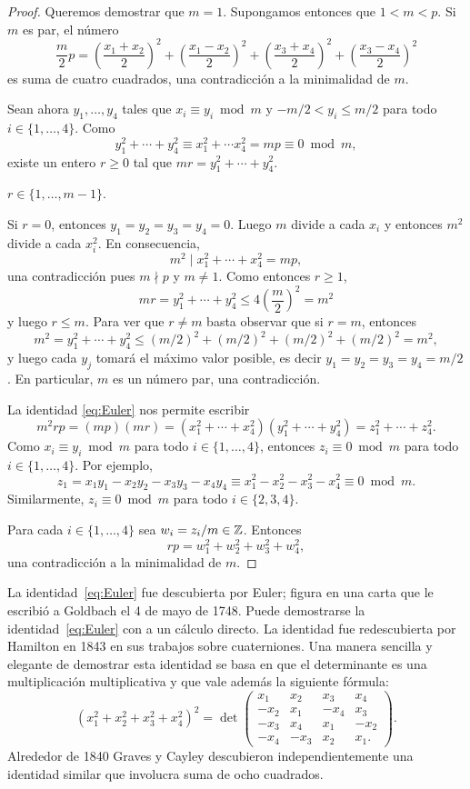 \begin{proof}
	Queremos demostrar que $m=1$. Supongamos
	entonces que $1<m<p$. Si $m$ es par, el número 
	\[
		\frac{m}{2}p=\left(\frac{x_1+x_2}{2}\right)^2
		+\left(\frac{x_1-x_2}{2}\right)^2
		+\left(\frac{x_3+x_4}{2}\right)^2
		+\left(\frac{x_3-x_4}{2}\right)^2
	\]
	es suma de cuatro cuadrados, una contradicción a la minimalidad de $m$. 
	
	Sean ahora $y_1,\dots,y_4$ tales que $x_i\equiv y_i\bmod m$
	y $-m/2<y_i\leq m/2$ para todo $i\in\{1,\dots,4\}$. Como
	\[
		y_1^2+\cdots+y_4^2\equiv x_1^2+\cdots x_4^2= mp\equiv 0\bmod m,
	\]
	existe un entero $r\geq0$ tal que $mr=y_1^2+\cdots+y_4^2$. 
	
	\begin{claim}
		$r\in\{1,\dots,m-1\}$. 
	\end{claim}

	Si $r=0$, entonces $y_1=y_2=y_3=y_4=0$. Luego $m$ divide a cada $x_i$ y
	entonces $m^2$ divide a cada $x_i^2$. En consecuencia, 
	\[
		m^2\mid x_1^2+\cdots+x_4^2=mp,
	\]
	una contradicción pues $m\nmid p$ y $m\ne1$. Como entonces $r\geq 1$, 
	\[
		mr=y_1^2+\cdots+y_4^2\leq 4\left(\frac{m}{2}\right)^2=m^2
	\]
	y luego $r\leq m$. Para ver que $r\ne m$ basta observar que si $r=m$, 
	entonces 
	\[
		m^2=y_1^2+\cdots+y_4^2\leq (m/2)^2+(m/2)^2+(m/2)^2+(m/2)^2=m^2,
	\]
	y luego cada $y_j$ tomará el máximo valor posible, es decir
	$y_1=y_2=y_3=y_4=m/2$. En particular, $m$ es un número par, una contradicción. 

	\medskip
	La identidad \ref{eq:Euler} nos permite escribir
	\[
		m^2rp=(mp)(mr)=(x_1^2+\cdots+x_4^2)(y_1^2+\cdots+y_4^2)=z_1^2+\cdots+z_4^2.
	\]
	Como $x_i\equiv y_i\bmod m$ para todo $i\in\{1,\dots,4\}$, entonces 
	$z_i\equiv 0\bmod m$ para todo $i\in\{1,\dots,4\}$. Por ejemplo,
	\[
	z_1=x_1y_1-x_2y_2-x_3y_3-x_4y_4\equiv x_1^2-x_2^2-x_3^2-x_4^2\equiv 0\bmod m.
	\]
	Similarmente, $z_i\equiv0\bmod m$ para todo $i\in\{2,3,4\}$. 
	
	Para cada $i\in\{1,\dots,4\}$ sea
	$w_i=z_i/m\in\mathbb{Z}$. Entonces 
	\[
		rp=w_1^2+w_2^2+w_3^2+w_4^2,
	\]
	una contradicción a la minimalidad de $m$.
\end{proof}

La identidad~\eqref{eq:Euler} fue descubierta por Euler; figura en una carta
que le escribió a Goldbach el 4 de mayo de 1748. Puede demostrarse la
identidad~\eqref{eq:Euler} con a un cálculo directo. La identidad fue
redescubierta por Hamilton en 1843 en sus trabajos sobre cuaterniones. Una
manera sencilla y elegante de demostrar esta identidad se basa en que el
determinante es una multiplicación multiplicativa y que vale además la
siguiente fórmula:
\[
	(x_1^2+x_2^2+x_3^2+x_4^2)^2=\det\begin{pmatrix}
		x_1 & x_2 & x_3 & x_4\\
		-x_2 & x_1 & -x_4 & x_3\\
		-x_3 & x_4 & x_1 & -x_2\\
		-x_4 & -x_3 & x_2 & x_1.
	\end{pmatrix}.
\]
Alrededor de 1840 Graves y Cayley descubieron independientemente una identidad
similar que involucra suma de ocho cuadrados. 

